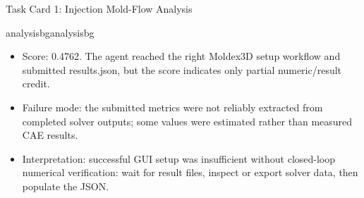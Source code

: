 \begin{ColorTaskCard}{Task Card 1: Injection Mold-Flow Analysis \hfill {}}
\begin{minipage}[t]{0.49\linewidth}
\begin{CardBlock}{analysisbg}{analysisbg}
\begin{itemize}
\item Score: 0.4762. The agent reached the right Moldex3D setup workflow and submitted results.json, but the score indicates only partial numeric/result credit.
\item Failure mode: the submitted metrics were not reliably extracted from completed solver outputs; some values were estimated rather than measured CAE results.
\item Interpretation: successful GUI setup was insufficient without closed-loop numerical verification: wait for result files, inspect or export solver data, then populate the JSON.
\end{itemize}
\end{CardBlock}
\end{minipage}
\end{ColorTaskCard}
\clearpage
